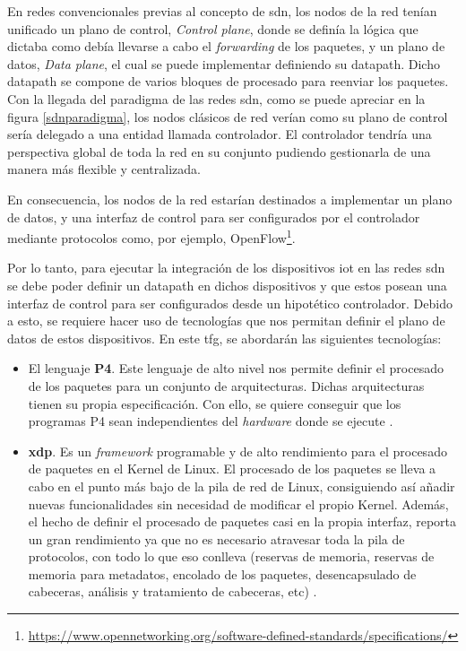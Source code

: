 En redes convencionales previas al concepto de \gls{sdn}, los nodos de la red tenían unificado un plano de control, \textit{Control plane}, donde se definía la lógica que dictaba como debía llevarse a cabo el \textit{forwarding} de los paquetes, y un plano de datos, \textit{Data plane}, el cual se puede implementar definiendo su datapath. Dicho datapath se compone de varios bloques de procesado para reenviar los paquetes. Con la llegada del paradigma de las redes \gls{sdn}, como se puede apreciar en la figura \ref{sdnparadigma}, los nodos clásicos de red verían como su plano de control sería delegado a una entidad llamada controlador. El controlador tendría una perspectiva global de toda la red en su conjunto pudiendo gestionarla de una manera más flexible y centralizada. \\
\par
En consecuencia, los nodos de la red estarían destinados a implementar un plano de datos, y una interfaz de control para ser configurados por el controlador mediante protocolos como, por ejemplo, OpenFlow\footnote{\url{https://www.opennetworking.org/software-defined-standards/specifications/}}. \\
\par
Por lo tanto, para ejecutar la integración de los dispositivos \gls{iot} en las redes \gls{sdn} se debe poder definir un datapath en dichos dispositivos y que estos posean una interfaz de control para ser configurados desde un hipotético controlador. Debido a esto, se requiere hacer uso de tecnologías que nos permitan definir el plano de datos de estos dispositivos. En este \gls{tfg}, se abordarán las siguientes tecnologías:

\begin{itemize}
    \item El lenguaje \textbf{P4}. Este lenguaje de alto nivel nos permite definir el procesado de los paquetes para un conjunto de arquitecturas. Dichas arquitecturas tienen su propia especificación. Con ello, se quiere conseguir que los programas P4 sean independientes del \textit{hardware} donde se ejecute \cite{2014p4}.
    
    \item \textbf{\gls{xdp}}. Es un \textit{framework} programable y de alto rendimiento para el procesado de paquetes en el Kernel de Linux. El procesado de los paquetes se lleva a cabo en el punto más bajo de la pila de red de Linux, consiguiendo así añadir nuevas funcionalidades sin necesidad de modificar el propio Kernel. Además, el hecho de definir el procesado de paquetes casi en la propia interfaz, reporta un gran rendimiento ya que no es necesario atravesar toda la pila de protocolos, con todo lo que eso conlleva (reservas de memoria, reservas de memoria para metadatos, encolado de los paquetes, desencapsulado de cabeceras, análisis y tratamiento de cabeceras, etc) \cite{xdp1}. 
\end{itemize}



